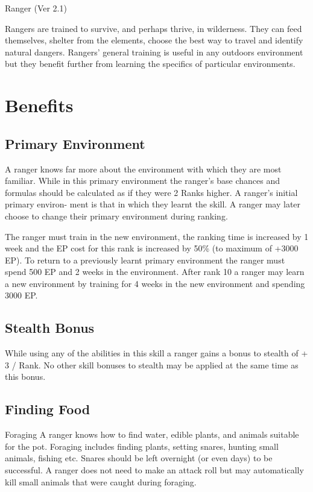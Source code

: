 \begin{Chapter}{Ranger (Ver 2.1)}

Rangers are trained to survive, and perhaps thrive, in wilderness.
They can feed themselves, shelter from the elements, choose the best
way to travel and identify natural dangers.  Rangers’ general training
is useful in any outdoors environment but they benefit further from
learning the specifics of particular environments.

\section{Benefits}

\subsection{Primary Environment}

A ranger knows far more about the environment with which they are most
familiar.  While in this primary environment the ranger’s base chances
and formulas should be calculated as if they were 2 Ranks higher.  A
ranger’s initial primary environ- ment is that in which they learnt
the skill.  A ranger may later choose to change their primary
environment during ranking.

The ranger must train in the new environment, the ranking time is
increased by 1 week and the EP cost for this rank is increased by 50\%
(to maximum of +3000 EP).  To return to a previously learnt primary
environment the ranger must spend 500 EP and 2 weeks in the
environment.  After rank 10 a ranger may learn a new environment by
training for 4 weeks in the new environment and spending 3000 EP.

\subsection{Stealth Bonus}

While using any of the abilities in this skill a ranger gains a bonus
to stealth of + 3 / Rank.  No other skill bonuses to stealth may be
applied at the same time as this bonus.

\subsection{Finding Food}

\begin{Description}
\item[Foraging] A ranger knows how to find water, edible plants, and
  animals suitable for the pot. Foraging includes finding plants,
  setting snares, hunting small animals, fishing etc.  Snares should
  be left overnight (or even days) to be successful. A ranger does not
  need to make an attack roll but may automatically kill small
  animals that were caught during foraging.


\end{Description}
\end{Chapter}
